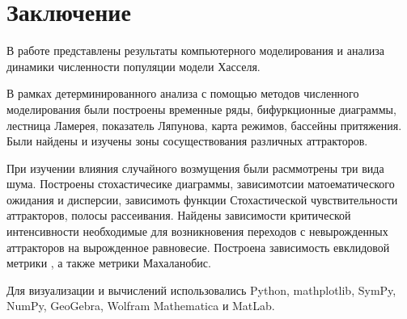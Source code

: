 \section{Заключение}

    В работе представлены результаты компьютерного моделирования и анализа динамики численности популяции модели Хасселя. 
    
    В рамках детерминированного анализа с помощью методов численного моделирования были построены временные ряды, бифуркционные диаграммы, лестница Ламерея, показатель Ляпунова, карта режимов, бассейны притяжения. Были найдены и изучены зоны сосуществования различных аттракторов. 

    При изучении влияния случайного возмущения были расммотрены три вида шума. Построены стохастичесике диаграммы, зависимотсии матоематического ожидания и дисперсии, зависимоть функции Стохастической чувствительности аттракторов, полосы рассеивания. Найдены зависимости критической интенсивности необходимые для возникновения переходов с невырожденных аттракторов на вырожденное равновесие. Построена зависимость евклидовой метрики , а также метрики Махаланобис.

    Для визуализации и вычислений использовались Python, mathplotlib, SymPy, NumPy, GeoGebra, Wolfram Mathematica и MatLab.
